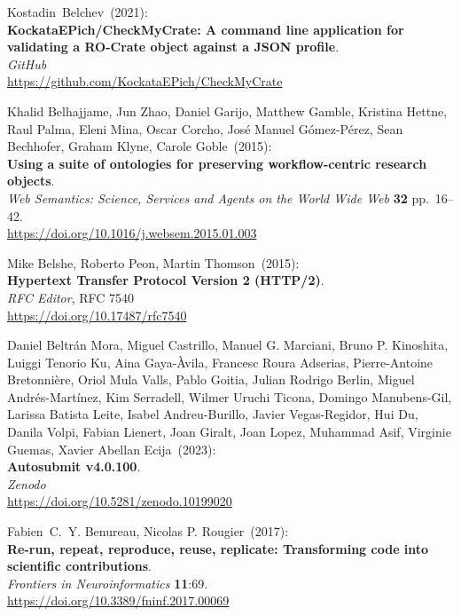\begin{thebibliography}{9}
Kostadin~Belchev~(2021): \\
\textbf{KockataEPich/CheckMyCrate: A command line application for validating a RO-Crate object against a JSON profile}.\\
\emph{GitHub}\\
\url{https://github.com/KockataEPich/CheckMyCrate}

Khalid Belhajjame, Jun Zhao, Daniel Garijo, Matthew Gamble, Kristina Hettne, Raul Palma, Eleni Mina, Oscar Corcho, José Manuel Gómez-Pérez, Sean Bechhofer, Graham Klyne, Carole Goble~(2015): \\
\textbf{Using a suite of ontologies for preserving workflow-centric research objects}.\\
\emph{Web Semantics: Science, Services and Agents on the World Wide Web}
\textbf{32} pp.~16--42.\\
\url{https://doi.org/10.1016/j.websem.2015.01.003}

Mike Belshe, Roberto Peon, Martin Thomson~(2015): \\
\textbf{Hypertext Transfer Protocol Version 2 (HTTP/2)}.\\
\emph{RFC Editor}, RFC 7540\\
\url{https://doi.org/10.17487/rfc7540}

Daniel Beltrán Mora, Miguel Castrillo, Manuel G. Marciani, Bruno P. Kinoshita, Luiggi Tenorio Ku, Aina Gaya-Àvila, Francesc Roura Adserias,  Pierre-Antoine Bretonnière, Oriol Mula Valls, Pablo Goitia, Julian Rodrigo Berlin,  Miguel Andrés-Martínez, Kim Serradell, Wilmer Uruchi Ticona,  Domingo Manubens-Gil, Larissa Batista Leite, Isabel Andreu-Burillo, Javier Vegas-Regidor, Hui Du, Danila Volpi, Fabian Lienert, Joan Giralt, Joan Lopez, Muhammad Asif, Virginie Guemas, Xavier Abellan Ecija~(2023):\\
\textbf{Autosubmit v4.0.100}.\\
\emph{Zenodo} \\
\url{https://doi.org/10.5281/zenodo.10199020}

Fabien~C.~Y. Benureau, Nicolas P. Rougier~(2017): \\
\textbf{Re-run, repeat, reproduce, reuse, replicate: Transforming code into scientific contributions}.\\
\emph{Frontiers in Neuroinformatics} \textbf{11}:69.\\
\url{https://doi.org/10.3389/fninf.2017.00069}


\end{thebibliography}
